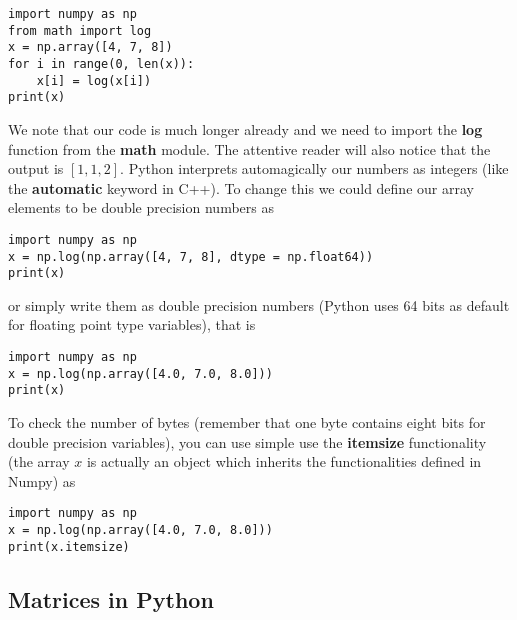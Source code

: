 \documentclass[%
oneside,                 %
final,                   %
10pt]{article}
\begin{document}
\begin{verbatim}
import numpy as np
from math import log
x = np.array([4, 7, 8])
for i in range(0, len(x)):
    x[i] = log(x[i])
print(x)

\end{verbatim}

We note that our code is much longer already and we need to import the \textbf{log} function from the \textbf{math} module. 
The attentive reader will also notice that the output is $[1, 1, 2]$. Python interprets automagically our numbers as integers (like the \textbf{automatic} keyword in C++). To change this we could define our array elements to be double precision numbers as




\begin{verbatim}
import numpy as np
x = np.log(np.array([4, 7, 8], dtype = np.float64))
print(x)

\end{verbatim}

or simply write them as double precision numbers (Python uses 64 bits as default for floating point type variables), that is




\begin{verbatim}
import numpy as np
x = np.log(np.array([4.0, 7.0, 8.0]))
print(x)

\end{verbatim}

To check the number of bytes (remember that one byte contains eight bits for double precision variables), you can use simple use the \textbf{itemsize} functionality (the array $x$ is actually an object which inherits the functionalities defined in Numpy) as 




\begin{verbatim}
import numpy as np
x = np.log(np.array([4.0, 7.0, 8.0]))
print(x.itemsize)

\end{verbatim}


\subsection*{Matrices in Python}
\end{document}
